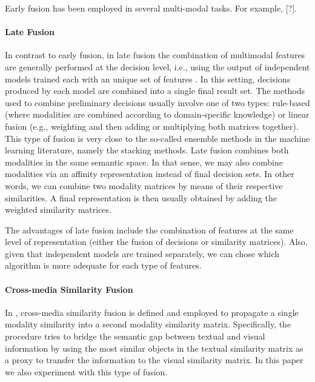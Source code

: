 \documentclass[11pt]{article}
\begin{document}

%
Early fusion has been employed in several multi-modal tasks. For example, [?]. 
\paragraph{Late Fusion}
In contrast to early fusion, in late fusion the combination of multimodal features are generally performed at the decision level, i.e., using the output of independent models trained  each with an unique set of features \cite{ClinchantAC11}. In this setting,  decisions produced by each model are combined into a single final result set.
%
The methods used to combine preliminary decisions usually involve one of two types: rule-based (where modalities are combined according to domain-specific knowledge) or linear fusion (e.g., weighting and then adding or multiplying both matrices together). This type of fusion is very close to the so-called ensemble methods in the machine learning literature, namely the stacking methods.
%
Late fusion combines both modalities in the same semantic space. In that sense,  we may also combine modalities via an affinity representation instead of final decision sets. In other words, we can combine two modality matrices by means of their respective similarities. A final representation is then usually obtained by adding the weighted similarity matrices.
%

The advantages of late fusion include the combination of features at the same level of representation (either the fusion of decisions or similarity matrices). Also, given that independent models are trained separately, we can chose which algorithm is more adequate for each type of
features.
\paragraph{Cross-media Similarity Fusion}

%
In \cite{Ah-PineCC15}, cross-media similarity fusion is defined and employed to propagate a single modality
similarity into a second modality similarity matrix. Specifically, the procedure tries to bridge the semantic
gap between textual and visual information by using the most similar objects in the textual similarity matrix as a proxy to transfer the information to the visual similarity matrix. In this paper we also experiment with this type of fusion.
\end{document}
